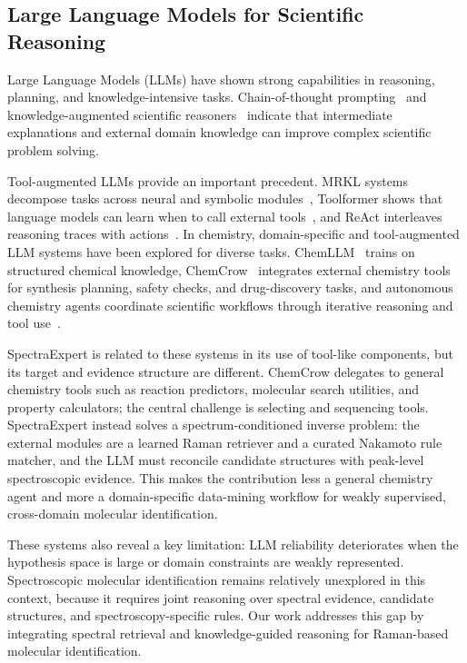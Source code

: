 \documentclass[conference]{IEEEtran}
\begin{document}
\subsection{Large Language Models for Scientific Reasoning}

Large Language Models (LLMs) have shown strong capabilities in reasoning, planning, and knowledge-intensive tasks. Chain-of-thought prompting~\cite{wei2022chain} and knowledge-augmented scientific reasoners~\cite{pang2024physics} indicate that intermediate explanations and external domain knowledge can improve complex scientific problem solving.

Tool-augmented LLMs provide an important precedent. MRKL systems decompose tasks across neural and symbolic modules~\cite{karpas2022mrkl}, Toolformer shows that language models can learn when to call external tools~\cite{schick2023toolformer}, and ReAct interleaves reasoning traces with actions~\cite{yao2023react}. In chemistry, domain-specific and tool-augmented LLM systems have been explored for diverse tasks. ChemLLM~\cite{zhang2024chemllm} trains on structured chemical knowledge, ChemCrow~\cite{m2024augmenting} integrates external chemistry tools for synthesis planning, safety checks, and drug-discovery tasks, and autonomous chemistry agents coordinate scientific workflows through iterative reasoning and tool use~\cite{boiko2023autonomous}.

SpectraExpert is related to these systems in its use of tool-like components, but its target and evidence structure are different. ChemCrow delegates to general chemistry tools such as reaction predictors, molecular search utilities, and property calculators; the central challenge is selecting and sequencing tools. SpectraExpert instead solves a spectrum-conditioned inverse problem: the external modules are a learned Raman retriever and a curated Nakamoto rule matcher, and the LLM must reconcile candidate structures with peak-level spectroscopic evidence. This makes the contribution less a general chemistry agent and more a domain-specific data-mining workflow for weakly supervised, cross-domain molecular identification.

These systems also reveal a key limitation: LLM reliability deteriorates when the hypothesis space is large or domain constraints are weakly represented. Spectroscopic molecular identification remains relatively unexplored in this context, because it requires joint reasoning over spectral evidence, candidate structures, and spectroscopy-specific rules. Our work addresses this gap by integrating spectral retrieval and knowledge-guided reasoning for Raman-based molecular identification.
\end{document}
